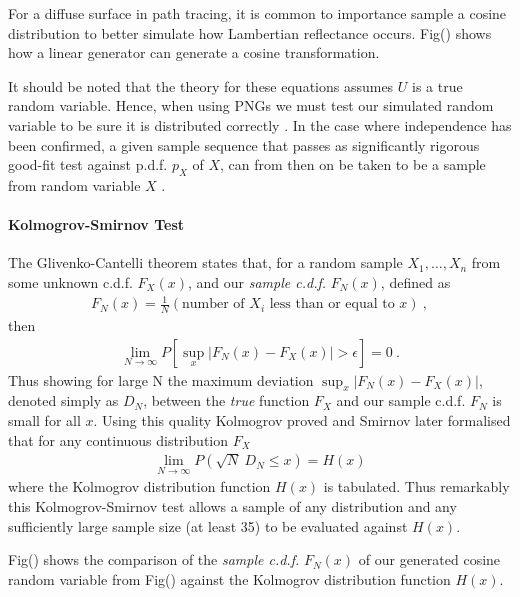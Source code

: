 \documentclass{article}
\begin{document}
For a diffuse surface in path tracing, it is common to importance sample a cosine distribution to 
better simulate how Lambertian reflectance occurs. Fig() shows how a linear 
generator can generate a cosine transformation.

It should be noted that the theory for these equations assumes $U$ is a true random variable.
Hence, when using PNGs we must test our simulated random variable to be sure it is distributed 
correctly \cite{alma9946168020001381}.
In the case where independence has been confirmed, a given sample sequence that passes as significantly 
rigorous good-fit test against p.d.f. $p_X$ of $X$, can from then on be taken to be a sample from
random variable $X$ \cite{HELLEKALEK1998485}.  

\paragraph{Kolmogrov-Smirnov Test}

The Glivenko-Cantelli theorem states that,
for a random sample  $X_{1},\dots,X_{n}$ from some unknown c.d.f. $F_X(x)$,
and our \textit{sample c.d.f.} $F_N(x)$, defined as 
\begin{align}
F_{N}(x)=\frac{1}{N}(\text{number of $X_{i}$ less than or equal to $x$}) ~,
\end{align}
then
\begin{align}
\lim_{ N \to \infty } P\left[\sup_{x} |F_{N}(x)-F_{X}(x)|>\epsilon\right]  = 0 ~.
\end{align}
Thus showing for large N the maximum deviation
$\sup_{x} |F_{N}(x)-F_{X}(x)|$,
denoted simply as $D_N$, between the \textit{true} function $F_X$ and our sample c.d.f. $F_N$ is small 
for all $x$. 
Using this quality Kolmogrov proved and Smirnov later formalised that for any continuous
distribution $F_X$
\begin{align}
\lim_{ N \to \infty } P(\sqrt{ N }~D_{N}\leq x)=H(x)
\end{align}
where the Kolmogrov distribution function $H(x)$ is tabulated. 
Thus remarkably this Kolmogrov-Smirnov test allows a sample of any distribution and any 
sufficiently large sample size (at least 35) to be evaluated against $H(x)$. \cite{alma9954732790001381}

Fig() shows the comparison of the \textit{sample c.d.f.} $F_N(x)$ of our generated cosine random variable 
from Fig() against the Kolmogrov distribution function $H(x)$.





 
\end{document}
